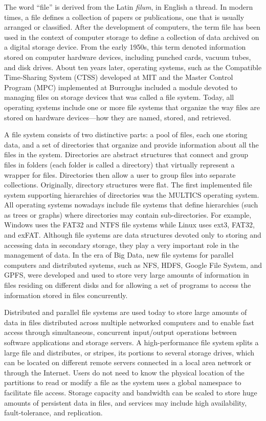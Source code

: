 The word ``file'' is derived from the Latin \textit{filum}, in English a thread. In modern times, a file defines a collection of  papers or publications, one that is usually arranged or classified. After the development of computers, the term file has been used in the context of computer storage to define a collection of data archived on a digital storage device. From the early 1950s, this term denoted information stored on computer hardware devices, including punched cards, vacuum tubes, and disk drives. About ten years later, operating systems, such as the Compatible Time-Sharing System (CTSS) developed at MIT and the Master Control Program (MPC) implemented at Burroughs included a module devoted to managing files on storage devices that was called a file system. Today, all operating systems include one or more file systems that organize the way files are stored on hardware devices---how they are named, stored, and retrieved.

A file system consists of two distinctive parts: a pool of files, each one storing data, and a set of directories that organize and provide information about all the files in the system. Directories are abstract structures that connect and group files in folders (each folder is called a directory) that virtually represent a wrapper for files. Directories then allow a user to group files into separate collections. Originally, directory structures were flat. The first implemented file system supporting hierarchies of directories was the MULTICS operating system. All operating systems nowadays include file systems that define hierarchies (such as trees or graphs) where directories may contain sub-directories. For example, Windows uses the FAT32 and NTFS file systems while Linux uses ext3, FAT32, and exFAT. Although file systems are data structures devoted only to storing and accessing data in secondary storage, they play a very important role in the management of data. In the era of Big Data, new file systems for parallel computers and distributed systems, such as NFS, HDFS, Google File System, and GPFS, were developed and used to store very large amounts of information in files residing on different disks and for allowing a set of programs to access the information stored in files concurrently.

Distributed and parallel file systems are used today to store large amounts of data in files distributed across multiple networked computers and to enable fast access through simultaneous, concurrent input/output operations between software applications and storage servers. A high-performance file system splits a large file and distributes, or stripes, its portions to several storage drives, which can be located on different remote servers connected in a local area network or through the Internet. Users do not need to know the physical location of the partitions to read or modify a file as the system uses a global namespace to facilitate file access. Storage capacity and bandwidth can be scaled to store huge amounts of persistent data in files, and services may include high availability,  fault-tolerance, and replication.

